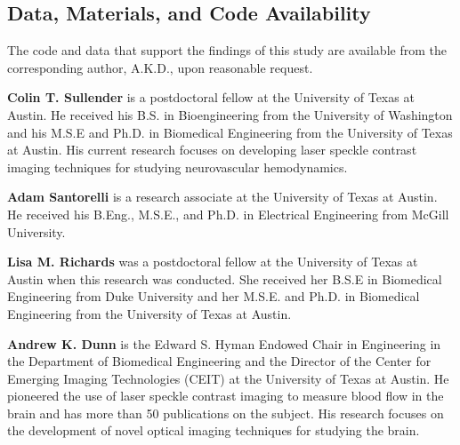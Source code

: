 \documentclass[12pt]{spieman}
\begin{document}
\begin{spacing}{2}
\subsection* {Data, Materials, and Code Availability} 
The code and data that support the findings of this study are available from the corresponding author, A.K.D., upon reasonable request.






\vspace{1ex}
\vspace{2ex}\noindent\textbf{Colin T. Sullender} is a postdoctoral fellow at the University of Texas at Austin. He received his B.S. in Bioengineering from the University of Washington and his M.S.E and Ph.D. in Biomedical Engineering from the University of Texas at Austin. His current research focuses on developing laser speckle contrast imaging techniques for studying neurovascular hemodynamics.

\vspace{2ex}\noindent\textbf{Adam Santorelli} is a research associate at the University of Texas at Austin. He received his B.Eng., M.S.E., and Ph.D. in Electrical Engineering from McGill University.

\vspace{2ex}\noindent\textbf{Lisa M. Richards} was a postdoctoral fellow at the University of Texas at Austin when this research was conducted. She received her B.S.E in Biomedical Engineering from Duke University and her M.S.E. and Ph.D. in Biomedical Engineering from the University of Texas at Austin.

\vspace{2ex}\noindent\textbf{Andrew K. Dunn} is the Edward S. Hyman Endowed Chair in Engineering in the Department of Biomedical Engineering and the Director of the Center for Emerging Imaging Technologies (CEIT) at the University of Texas at Austin. He pioneered the use of laser speckle contrast imaging to measure blood flow in the brain and has more than 50 publications on the subject. His research focuses on the development of novel optical imaging techniques for studying the brain.


\listoffigures
\listoftables


\end{spacing}
\end{document}
